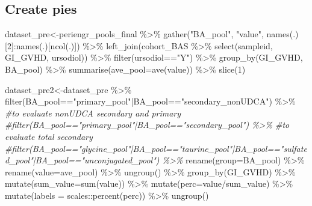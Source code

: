 \documentclass[
]{book}
\newenvironment{Shaded}{\begin{snugshade}}{\end{snugshade}}
\newcommand{\AttributeTok}[1]{\textcolor[rgb]{0.77,0.63,0.00}{#1}}
\newcommand{\CommentTok}[1]{\textcolor[rgb]{0.56,0.35,0.01}{\textit{#1}}}
\newcommand{\DecValTok}[1]{\textcolor[rgb]{0.00,0.00,0.81}{#1}}
\newcommand{\FunctionTok}[1]{\textcolor[rgb]{0.00,0.00,0.00}{#1}}
\newcommand{\NormalTok}[1]{#1}
\newcommand{\OtherTok}[1]{\textcolor[rgb]{0.56,0.35,0.01}{#1}}
\newcommand{\SpecialCharTok}[1]{\textcolor[rgb]{0.00,0.00,0.00}{#1}}
\newcommand{\StringTok}[1]{\textcolor[rgb]{0.31,0.60,0.02}{#1}}
\begin{document}
\hypertarget{create-pies-1}{%
\subsection{Create pies}\label{create-pies-1}}

\begin{Shaded}
\begin{Highlighting}[]
\NormalTok{dataset\_pre}\OtherTok{\textless{}{-}}\NormalTok{periengr\_pools\_final }\SpecialCharTok{\%\textgreater{}\%} 
  \FunctionTok{gather}\NormalTok{(}\StringTok{"BA\_pool"}\NormalTok{, }\StringTok{"value"}\NormalTok{, }\FunctionTok{names}\NormalTok{(.)[}\DecValTok{2}\NormalTok{]}\SpecialCharTok{:}\FunctionTok{names}\NormalTok{(.)[}\FunctionTok{ncol}\NormalTok{(.)]) }\SpecialCharTok{\%\textgreater{}\%} 
  \FunctionTok{left\_join}\NormalTok{(cohort\_BAS }\SpecialCharTok{\%\textgreater{}\%} \FunctionTok{select}\NormalTok{(sampleid, GI\_GVHD, ursodiol)) }\SpecialCharTok{\%\textgreater{}\%} 
  \FunctionTok{filter}\NormalTok{(ursodiol}\SpecialCharTok{==}\StringTok{"Y"}\NormalTok{) }\SpecialCharTok{\%\textgreater{}\%} 
  \FunctionTok{group\_by}\NormalTok{(GI\_GVHD, BA\_pool) }\SpecialCharTok{\%\textgreater{}\%} 
  \FunctionTok{summarise}\NormalTok{(}\AttributeTok{ave\_pool=}\FunctionTok{ave}\NormalTok{(value)) }\SpecialCharTok{\%\textgreater{}\%} \FunctionTok{slice}\NormalTok{(}\DecValTok{1}\NormalTok{)}

\NormalTok{dataset\_pre2}\OtherTok{\textless{}{-}}\NormalTok{dataset\_pre }\SpecialCharTok{\%\textgreater{}\%} 
  \FunctionTok{filter}\NormalTok{(BA\_pool}\SpecialCharTok{==}\StringTok{"primary\_pool"}\SpecialCharTok{|}\NormalTok{BA\_pool}\SpecialCharTok{==}\StringTok{"secondary\_nonUDCA"}\NormalTok{) }\SpecialCharTok{\%\textgreater{}\%} \CommentTok{\#to evaluate nonUDCA secondary and primary}
  \CommentTok{\#filter(BA\_pool=="primary\_pool"|BA\_pool=="secondary\_pool") \%\textgreater{}\% \#to evaluate total secondary}
  \CommentTok{\#filter(BA\_pool=="glycine\_pool"|BA\_pool=="taurine\_pool"|BA\_pool=="sulfated\_pool"|BA\_pool=="unconjugated\_pool") \%\textgreater{}\% }
  \FunctionTok{rename}\NormalTok{(}\AttributeTok{group=}\NormalTok{BA\_pool) }\SpecialCharTok{\%\textgreater{}\%} 
  \FunctionTok{rename}\NormalTok{(}\AttributeTok{value=}\NormalTok{ave\_pool) }\SpecialCharTok{\%\textgreater{}\%} 
  \FunctionTok{ungroup}\NormalTok{() }\SpecialCharTok{\%\textgreater{}\%} 
  \FunctionTok{group\_by}\NormalTok{(GI\_GVHD) }\SpecialCharTok{\%\textgreater{}\%} 
  \FunctionTok{mutate}\NormalTok{(}\AttributeTok{sum\_value=}\FunctionTok{sum}\NormalTok{(value)) }\SpecialCharTok{\%\textgreater{}\%} 
  \FunctionTok{mutate}\NormalTok{(}\AttributeTok{perc=}\NormalTok{value}\SpecialCharTok{/}\NormalTok{sum\_value) }\SpecialCharTok{\%\textgreater{}\%} 
  \FunctionTok{mutate}\NormalTok{(}\AttributeTok{labels =}\NormalTok{ scales}\SpecialCharTok{::}\FunctionTok{percent}\NormalTok{(perc)) }\SpecialCharTok{\%\textgreater{}\%} 
  \FunctionTok{ungroup}\NormalTok{()}


\end{Highlighting}
\end{Shaded}
\end{document}
